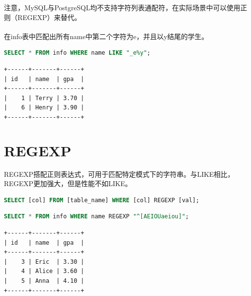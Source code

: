 \documentclass[12pt, openany, oneside]{book}
\begin{document}
注意，MySQL与PostgreSQL均不支持字符列表通配符，在实际场景中可以使用正则（REGEXP）来替代。\\

\\

在info表中匹配出所有name中第二个字符为e，并且以y结尾的学生。

\vspace{-0.5cm}

\begin{lstlisting}[language=SQL]
SELECT * FROM info WHERE name LIKE "_e%y";
\end{lstlisting}

\begin{tcolorbox}
\begin{verbatim}
+------+-------+------+
| id   | name  | gpa  |
+------+-------+------+
|    1 | Terry | 3.70 |
|    6 | Henry | 3.90 |
+------+-------+------+
\end{verbatim}
\end{tcolorbox}

\vspace{0.5cm}

\section{REGEXP}

REGEXP搭配正则表达式，可用于匹配特定模式下的字符串。与LIKE相比，REGEXP更加强大，但是性能不如LIKE。

\vspace{-0.5cm}

\begin{lstlisting}[language=SQL]
SELECT [col] FROM [table_name] WHERE [col] REGEXP [val];
\end{lstlisting}

\vspace{0.5cm}


\begin{lstlisting}[language=SQL]
SELECT * FROM info WHERE name REGEXP "^[AEIOUaeiou]";
\end{lstlisting}

\begin{tcolorbox}
\begin{verbatim}
+------+-------+------+
| id   | name  | gpa  |
+------+-------+------+
|    3 | Eric  | 3.30 |
|    4 | Alice | 3.60 |
|    5 | Anna  | 4.10 |
+------+-------+------+
\end{verbatim}
\end{tcolorbox}
\end{document}
